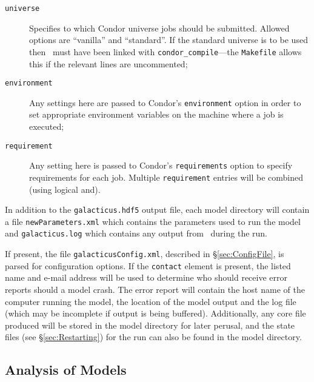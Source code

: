 \begin{description}
\begin{description}
\item[{\tt universe}] Specifies to which {\sc Condor} universe jobs should be submitted. Allowed options are ``vanilla'' and ``standard''. If the standard universe is to be used then \glc\ must have been linked with {\tt condor\_compile}---the {\tt Makefile} allows this if the relevant lines are uncommented;
\item[{\tt environment}] Any settings here are passed to {\sc Condor}'s {\tt environment} option in order to set appropriate environment variables on the machine where a job is executed;
\item[{\tt requirement}] Any setting here is passed to {\sc Condor}'s {\tt requirements} option to specify requirements for each job. Multiple {\tt requirement} entries will be combined (using logical and).
\end{description}
\end{description}

In addition to the {\tt galacticus.hdf5} output file, each model directory will contain a file {\tt newParameters.xml} which contains the parameters used to run the model and {\tt galacticus.log} which contains any output from \glc\ during the run.

If present, the file {\tt galacticusConfig.xml}, described in \S\ref{sec:ConfigFile}, is parsed for configuration options. If the {\tt contact} element is present, the listed name and e-mail address will be used to determine who should receive error reports should a model crash. The error report will contain the host name of the computer running the model, the location of the model output and the log file (which may be incomplete if output is being buffered). Additionally, any core file produced will be stored in the model directory for later perusal, and the state files (see \S\ref{sec:Restarting}) for the run can also be found in the model directory.

\subsection{Analysis of Models}\label{sec:AnalysisScripts}

